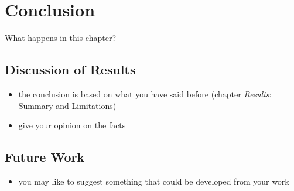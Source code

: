 \chapter{Conclusion}

What happens in this chapter?

\section{Discussion of Results}

\begin{itemize}
\item the conclusion is based on what you have said before (chapter \textit{Results}: Summary and Limitations)
\item give your opinion on the facts
\end{itemize}

\section{Future Work}

\begin{itemize}
\item you may like to suggest something that could be developed from your work
\end{itemize}